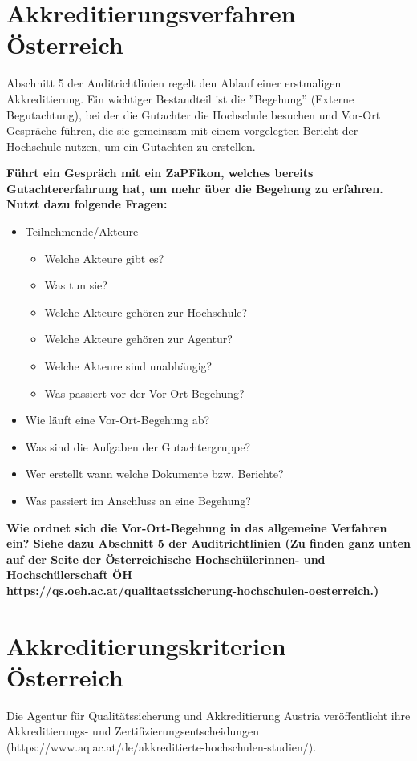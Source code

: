 \documentclass{scrartcl}
\begin{document}
\newpage
\section*{Akkreditierungsverfahren Österreich}
Abschnitt 5 der Auditrichtlinien regelt den Ablauf einer erstmaligen Akkreditierung. Ein wichtiger Bestandteil ist die ''Begehung'' (Externe Begutachtung), bei der die Gutachter die Hochschule besuchen und Vor-Ort Gespräche führen, die sie gemeinsam mit einem vorgelegten Bericht der Hochschule nutzen, um ein Gutachten zu erstellen.

\vspace{0.5cm}

\textbf{Führt ein Gespräch mit ein ZaPFikon, welches bereits Gutachtererfahrung hat, um mehr über die Begehung zu erfahren. Nutzt dazu folgende Fragen: }

\begin{itemize}
\item Teilnehmende/Akteure
	\begin{itemize}
		\item Welche Akteure gibt es?
		\item Was tun sie?
		\item Welche Akteure gehören zur Hochschule?
		\item Welche Akteure gehören zur Agentur?
		\item Welche Akteure sind unabhängig?
		\item Was passiert vor der Vor-Ort Begehung?
	\end{itemize}
\item Wie läuft eine Vor-Ort-Begehung ab?
\item Was sind die Aufgaben der Gutachtergruppe?
\item Wer erstellt wann welche Dokumente bzw. Berichte?
\item Was passiert im Anschluss an eine Begehung?
\end{itemize}

\textbf{Wie ordnet sich die Vor-Ort-Begehung in das allgemeine Verfahren ein? Siehe dazu Abschnitt 5 der Auditrichtlinien (Zu finden ganz unten auf der Seite der Österreichische Hochschülerinnen- und Hochschülerschaft ÖH\\
https://qs.oeh.ac.at/qualitaetssicherung-hochschulen-oesterreich.)}

\newpage
\section*{Akkreditierungskriterien Österreich}
Die Agentur für Qualitätssicherung und Akkreditierung Austria veröffentlicht ihre Akkreditierungs- und Zertifizierungsentscheidungen (https://www.aq.ac.at/de/akkreditierte-hochschulen-studien/).
\end{document}
